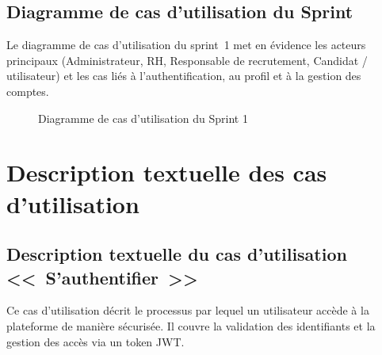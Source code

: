 \subsection{Diagramme de cas d'utilisation du Sprint}

Le diagramme de cas d'utilisation du sprint~1 met en évidence les acteurs
principaux (Administrateur, RH, Responsable de recrutement, Candidat /
utilisateur) et les cas liés à l'authentification, au profil et à la gestion
des comptes.

\begin{figure}[htbp]
  \centering
  \caption{Diagramme de cas d'utilisation du Sprint 1}
  \label{fig:uc-sprint1}
\end{figure}


\section{Description textuelle des cas d'utilisation}

\subsection{Description textuelle du cas d'utilisation <<~S'authentifier~>>}

Ce cas d'utilisation décrit le processus par lequel un utilisateur accède à
la plateforme de manière sécurisée. Il couvre la validation des identifiants
et la gestion des accès via un token JWT.

